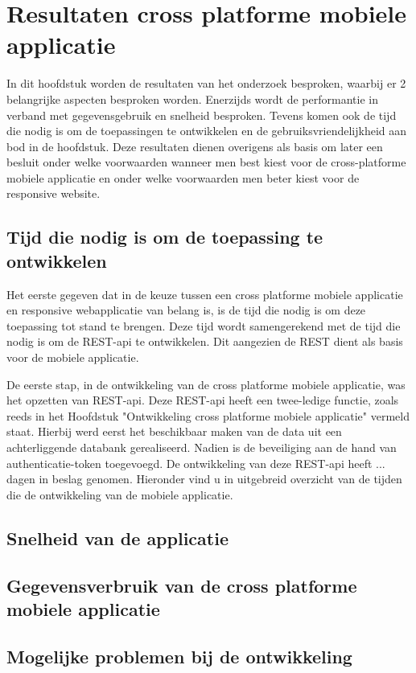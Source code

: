\chapter{Resultaten cross platforme mobiele applicatie}
\label{ch:resultatencrossplatformapp}
In dit hoofdstuk worden de resultaten van het onderzoek besproken, waarbij er 2 belangrijke aspecten besproken worden.
Enerzijds wordt de performantie in verband met gegevensgebruik en  snelheid besproken.
Tevens komen ook de tijd die nodig is om de toepassingen te ontwikkelen en de gebruiksvriendelijkheid aan bod in de hoofdstuk.
Deze resultaten dienen overigens als basis om later een besluit onder welke voorwaarden wanneer men best kiest voor de
cross-platforme mobiele applicatie en onder welke voorwaarden men beter kiest voor de responsive website.

\section{Tijd die nodig is om de toepassing te ontwikkelen}
Het eerste gegeven dat in de keuze tussen een cross platforme mobiele applicatie en responsive webapplicatie van belang is,
is de tijd die nodig is om deze toepassing tot stand te brengen. Deze tijd wordt samengerekend met de tijd die nodig is om de
REST-api te ontwikkelen. Dit aangezien de REST dient als basis voor de mobiele applicatie.

De eerste stap, in de ontwikkeling van de cross platforme mobiele applicatie, was het opzetten van REST-api.
Deze REST-api heeft een twee-ledige functie, zoals reeds in het Hoofdstuk "Ontwikkeling cross platforme mobiele applicatie" vermeld staat.
Hierbij werd eerst het beschikbaar maken van de data uit een achterliggende databank gerealiseerd. Nadien is de beveiliging aan de hand
van authenticatie-token toegevoegd. De ontwikkeling van deze REST-api heeft ... dagen in beslag genomen. Hieronder vind u in uitgebreid
overzicht van de tijden die de ontwikkeling van de mobiele applicatie.









\section{Snelheid van de applicatie}


\section{Gegevensverbruik van de cross platforme mobiele applicatie}

\section{Mogelijke problemen bij de ontwikkeling}
